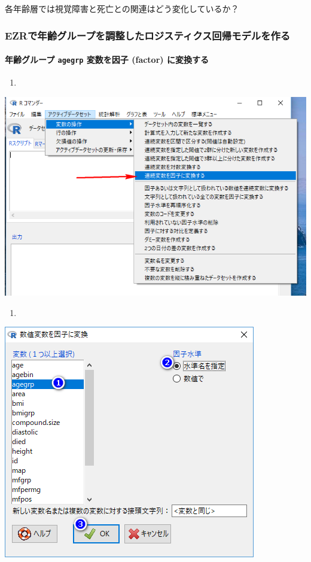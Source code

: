 \documentclass[11pt,]{problemset}
\let\oldparagraph\paragraph
\renewcommand{\paragraph}[1]{\oldparagraph{#1}\mbox{}}
\begin{document}
各年齢層では視覚障害と死亡との関連はどう変化しているか？

\newpage

\vfill

\subsubsection{EZRで年齢グループを調整したロジスティクス回帰モデルを作る}\label{ezr}

\paragraph{\texorpdfstring{年齢グループ \texttt{agegrp} 変数を因子
(factor)
に変換する}{年齢グループ agegrp 変数を因子 (factor) に変換する}}\label{-agegrp--factor-}

\begin{enumerate}
\def\labelenumi{\arabic{enumi}.}
\item
\end{enumerate}

\begin{center}\includegraphics[width=0.55\linewidth,height=0.5\textheight]{pic/mltlogstic00} \end{center}

\begin{enumerate}
\def\labelenumi{\arabic{enumi}.}
\setcounter{enumi}{1}
\item
\end{enumerate}

\begin{center}\includegraphics[width=0.55\linewidth,height=0.5\textheight]{pic/mltlogstic01} \end{center}
\end{document}
